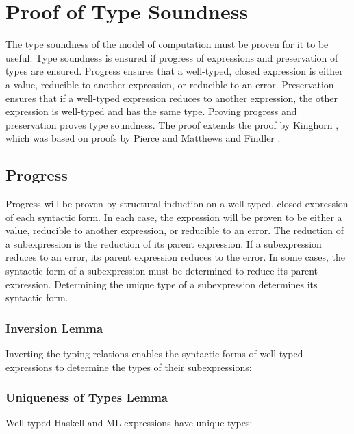 \chapter{Proof of Type Soundness}

The type soundness of the model of computation must be proven for it to be useful.  Type soundness is ensured if progress of expressions and preservation of types are ensured.  Progress ensures that a well-typed, closed expression is either a value, reducible to another expression, or reducible to an error.  Preservation ensures that if a well-typed expression reduces to another expression, the other expression is well-typed and has the same type.  Proving progress and preservation proves type soundness.  The proof extends the proof by Kinghorn \cite{kinghorn07}, which was based on proofs by Pierce \cite{pierce02} and Matthews and Findler \cite{matthews07}.

\section{Progress}

Progress will be proven by structural induction on a well-typed, closed expression of each syntactic form.  In each case, the expression will be proven to be either a value, reducible to another expression, or reducible to an error.  The reduction of a subexpression is the reduction of its parent expression.  If a subexpression reduces to an error, its parent expression reduces to the error.  In some cases, the syntactic form of a subexpression must be determined to reduce its parent expression.  Determining the unique type of a subexpression determines its syntactic form.

\subsection{Inversion Lemma}

Inverting the typing relations enables the syntactic forms of well-typed expressions to determine the types of their subexpressions:



\subsection{Uniqueness of Types Lemma}

Well-typed Haskell and ML expressions have unique types:

